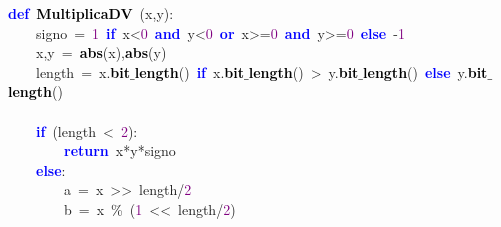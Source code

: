 \noindent
\mbox{}\textbf{\textcolor{Blue}{def}}\ \textbf{\textcolor{Black}{MultiplicaDV}}\ \textcolor{BrickRed}{(}x\textcolor{BrickRed}{,}y\textcolor{BrickRed}{):} \\
\mbox{}\ \ \ \ signo\ \textcolor{BrickRed}{=}\ \textcolor{Purple}{1}\ \textbf{\textcolor{Blue}{if}}\ x\textcolor{BrickRed}{\textless{}}\textcolor{Purple}{0}\ \textbf{\textcolor{Blue}{and}}\ y\textcolor{BrickRed}{\textless{}}\textcolor{Purple}{0}\ \textbf{\textcolor{Blue}{or}}\ x\textcolor{BrickRed}{\textgreater{}=}\textcolor{Purple}{0}\ \textbf{\textcolor{Blue}{and}}\ y\textcolor{BrickRed}{\textgreater{}=}\textcolor{Purple}{0}\ \textbf{\textcolor{Blue}{else}}\ \textcolor{BrickRed}{-}\textcolor{Purple}{1} \\
\mbox{}\ \ \ \ x\textcolor{BrickRed}{,}y\ \textcolor{BrickRed}{=}\ \textbf{\textcolor{Black}{abs}}\textcolor{BrickRed}{(}x\textcolor{BrickRed}{),}\textbf{\textcolor{Black}{abs}}\textcolor{BrickRed}{(}y\textcolor{BrickRed}{)} \\
\mbox{}\ \ \ \ length\ \textcolor{BrickRed}{=}\ x\textcolor{BrickRed}{.}\textbf{\textcolor{Black}{bit$\_$length}}\textcolor{BrickRed}{()}\ \textbf{\textcolor{Blue}{if}}\ x\textcolor{BrickRed}{.}\textbf{\textcolor{Black}{bit$\_$length}}\textcolor{BrickRed}{()}\ \textcolor{BrickRed}{\textgreater{}}\ y\textcolor{BrickRed}{.}\textbf{\textcolor{Black}{bit$\_$length}}\textcolor{BrickRed}{()}\ \textbf{\textcolor{Blue}{else}}\ y\textcolor{BrickRed}{.}\textbf{\textcolor{Black}{bit$\_$length}}\textcolor{BrickRed}{()} \\
\mbox{} \\
\mbox{}\ \ \ \ \textbf{\textcolor{Blue}{if}}\ \textcolor{BrickRed}{(}length\ \textcolor{BrickRed}{\textless{}}\ \textcolor{Purple}{2}\textcolor{BrickRed}{):} \\
\mbox{}\ \ \ \ \ \ \ \ \textbf{\textcolor{Blue}{return}}\ x\textcolor{BrickRed}{*}y\textcolor{BrickRed}{*}signo \\
\mbox{}\ \ \ \ \textbf{\textcolor{Blue}{else}}\textcolor{BrickRed}{:} \\
\mbox{}\ \ \ \ \ \ \ \ a\ \textcolor{BrickRed}{=}\ x\ \textcolor{BrickRed}{\textgreater{}\textgreater{}}\ length\textcolor{BrickRed}{/}\textcolor{Purple}{2} \\
\mbox{}\ \ \ \ \ \ \ \ b\ \textcolor{BrickRed}{=}\ x\ \textcolor{BrickRed}{\%}\ \textcolor{BrickRed}{(}\textcolor{Purple}{1}\ \textcolor{BrickRed}{\textless{}\textless{}}\ length\textcolor{BrickRed}{/}\textcolor{Purple}{2}\textcolor{BrickRed}{)} \\
